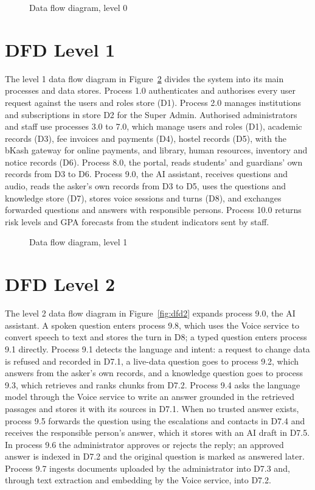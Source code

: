 {
  \begin{figure}[!htbp]
    \centering
    \caption{Data flow diagram, level 0}
    \label{fig:dfd0}
  \end{figure}
}

\section{DFD Level 1}
The level 1 data flow diagram in Figure~\ref{fig:dfd1} divides the system into its main processes and data stores. Process 1.0 authenticates and authorises every user request against the users and roles store (D1). Process 2.0 manages institutions and subscriptions in store D2 for the Super Admin. Authorised administrators and staff use processes 3.0 to 7.0, which manage users and roles (D1), academic records (D3), fee invoices and payments (D4), hostel records (D5), with the bKash gateway for online payments, and library, human resources, inventory and notice records (D6). Process 8.0, the portal, reads students' and guardians' own records from D3 to D6. Process 9.0, the AI assistant, receives questions and audio, reads the asker's own records from D3 to D5, uses the questions and knowledge store (D7), stores voice sessions and turns (D8), and exchanges forwarded questions and answers with responsible persons. Process 10.0 returns risk levels and GPA forecasts from the student indicators sent by staff.

{
  \begin{figure}[!htbp]
    \centering
    \caption{Data flow diagram, level 1}
    \label{fig:dfd1}
  \end{figure}
}

\section{DFD Level 2}
The level 2 data flow diagram in Figure~\ref{fig:dfd2} expands process 9.0, the AI assistant. A spoken question enters process 9.8, which uses the Voice service to convert speech to text and stores the turn in D8; a typed question enters process 9.1 directly. Process 9.1 detects the language and intent: a request to change data is refused and recorded in D7.1, a live-data question goes to process 9.2, which answers from the asker's own records, and a knowledge question goes to process 9.3, which retrieves and ranks chunks from D7.2. Process 9.4 asks the language model through the Voice service to write an answer grounded in the retrieved passages and stores it with its sources in D7.1. When no trusted answer exists, process 9.5 forwards the question using the escalations and contacts in D7.4 and receives the responsible person's answer, which it stores with an AI draft in D7.5. In process 9.6 the administrator approves or rejects the reply; an approved answer is indexed in D7.2 and the original question is marked as answered later. Process 9.7 ingests documents uploaded by the administrator into D7.3 and, through text extraction and embedding by the Voice service, into D7.2.

